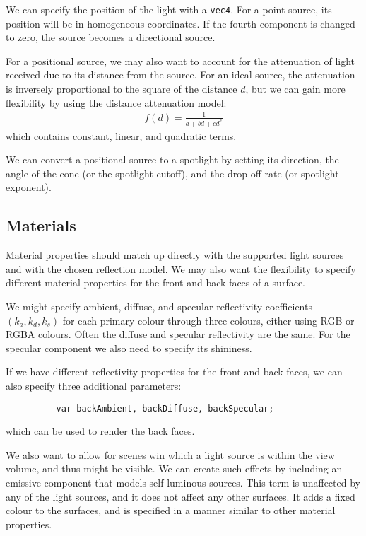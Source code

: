 \documentclass[../COS3712_Notes.tex]{subfiles}
\begin{document}
        We can specify the position of the light with a \texttt{vec4}.
        For a point source, its position will be in homogeneous coordinates.
        If the fourth component is changed to zero, the source becomes a directional source.

        For a positional source, we may also want to account for the attenuation of light
        received due to its distance from the source.
        For an ideal source, the attenuation is inversely proportional to the square of the
        distance $d$, but we can gain more flexibility by using the distance attenuation model:
        \begin{align*}
          f(d) = \frac{1}{a + bd + cd^2}
        \end{align*}
        which contains constant, linear, and quadratic terms.

        We can convert a positional source to a spotlight by setting its direction,
        the angle of the cone (or the spotlight cutoff), and the drop-off rate
        (or spotlight exponent).

      \subsection{Materials}
        Material properties should match up directly with the supported light sources
        and with the chosen reflection model.
        We may also want the flexibility to specify different material properties for the front
        and back faces of a surface.

        We might specify ambient, diffuse, and specular reflectivity coefficients $(k_a, k_d, k_s)$
        for each primary colour through three colours, either using RGB or RGBA colours.
        Often the diffuse and specular reflectivity are the same.
        For the specular component we also need to specify its shininess.

        If we have different reflectivity properties for the front and back faces,
        we can also specify three additional parameters:
        \begin{verbatim}
          var backAmbient, backDiffuse, backSpecular;
        \end{verbatim}
        which can be used to render the back faces.

        We also want to allow for scenes win which a light source is within the view volume,
        and thus might be visible.
        We can create such effects by including an emissive component that models
        self-luminous sources.
        This term is unaffected by any of the light sources,
        and it does not affect any other surfaces.
        It adds a fixed colour to the surfaces, and is specified in a manner similar to other
        material properties.
\end{document}

